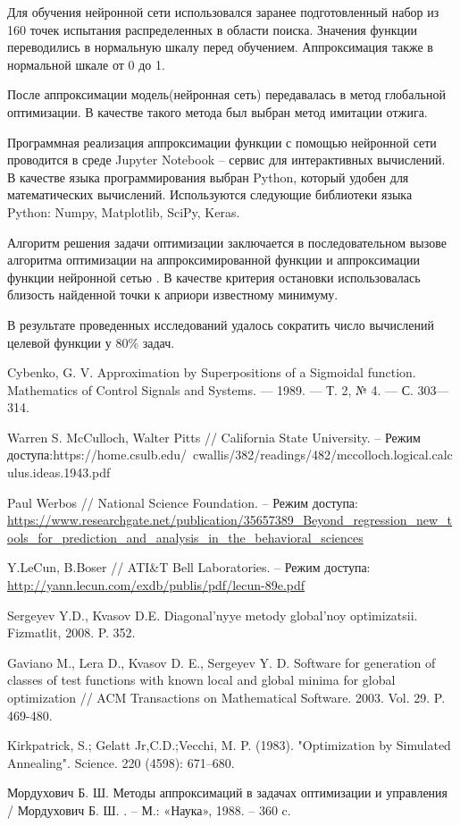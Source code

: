 \documentclass[11pt, oneside, a4paper]{article}
\begin{document}
Для обучения нейронной сети использовался заранее подготовленный набор из 160 точек испытания распределенных в области поиска.
Значения функции переводились в нормальную шкалу перед обучением. Аппроксимация также в нормальной шкале от 0 до 1.


После аппроксимации модель(нейронная сеть) передавалась в метод глобальной оптимизации.
В качестве такого метода был выбран метод имитации отжига\cite{fio_bib7}.


Программная реализация аппроксимации функции с помощью нейронной сети проводится в среде Jupyter Notebook – сервис для интерактивных вычислений. В качестве языка программирования выбран Python, который удобен для математических вычислений. Используются следующие библиотеки языка Python: Numpy, Matplotlib, SciPy, Keras.


Алгоритм решения задачи оптимизации заключается в последовательном вызове алгоритма оптимизации на аппроксимированной функции и аппроксимации функции нейронной сетью \cite{fio_bib8}. В качестве критерия остановки использовалась близость найденной точки к априори известному минимуму.

В результате проведенных исследований удалось сократить число вычислений целевой функции у 80\% задач.



\begin{biblio}

 Cybenko, G. V. Approximation by Superpositions of a Sigmoidal function. Mathematics of Control Signals and Systems. — 1989. — Т. 2, № 4. — С. 303—314.

 Warren S. McCulloch, Walter Pitts // California State University. – Режим доступа:https://home.csulb.edu/~cwallis/382/readings/482/mccolloch.logical.calculus.ideas.1943.pdf 

 Paul Werbos // National Science Foundation. – Режим доступа: \url{https://www.researchgate.net/publication/35657389_Beyond_regression_new_tools_for_prediction_and_analysis_in_the_behavioral_sciences}

 Y.LeCun, B.Boser // ATI\&T Bell Laboratories. – Режим доступа: \url{http://yann.lecun.com/exdb/publis/pdf/lecun-89e.pdf}

 Sergeyev Y.D., Kvasov D.E. Diagonal'nyye metody global'noy optimizatsii. Fizmatlit, 2008. P. 352.

 Gaviano M., Lera D., Kvasov D. E., Sergeyev Y. D. Software for generation of classes of test functions with known local and global minima for global optimization // ACM Transactions on Mathematical Software. 2003. Vol. 29. P. 469-480.

 Kirkpatrick, S.; Gelatt Jr,C.D.;Vecchi, M. P. (1983). "Optimization by Simulated Annealing". Science. 220 (4598): 671–680.

 Мордухович Б. Ш. Методы аппроксимаций в задачах оптимизации и управления / Мордухович Б. Ш. . – М.: «Наука», 1988. – 360 c.

\end{biblio}

\end{document}
